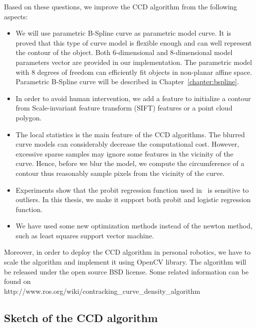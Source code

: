 Based on these questions, we improve the CCD algorithm from the
following aspects:
\begin{itemize}
\item We will use parametric B-Spline curve as
parametric model curve. It is proved that this type of curve model is
flexible enough and can well represent the contour of the
object. Both 6-dimensional and 8-dimensional model parameters vector
are provided in our implementation. The parametric model with 8
degrees of freedom can efficiently fit objects in non-planar affine
space. Parametric B-Spline curve will be described in
Chapter~\ref{chapter:bspline}.
\item In order to avoid human intervention, we add a feature to 
  initialize a contour from Scale-invariant feature transform (SIFT)
  features or a point cloud polygon.
\item The local statistics is the main feature of the CCD
  algorithms. The blurred curve models can considerably decrease the
  computational cost. However, excessive sparse samples may ignore some
  features in the vicinity of the curve. Hence, before we blur the
  model, we compute the circumference of a contour thus reasonably
  sample pixels from the vicinity of the curve.
\item Experiments show that the probit regression function used
  in~\cite{hanek2004contracting} is sensitive to outliers. In this
  thesis, we make it support both probit and logistic regression
  function.
\item We have used some new optimization methods instead of the
  newton method, such as least squares support vector machine.
\end{itemize}


Moreover, in order to deploy the CCD algorithm in personal robotics,
we have to scale the algorithm and implement it using OpenCV library.
The algorithm will be released under the open source BSD license. Some
related information can be found on\\
http://www.ros.org/wiki/contracking\_curve\_density\_algorithm

\subsection{Sketch of the CCD algorithm}
\label{sec:sccd}

